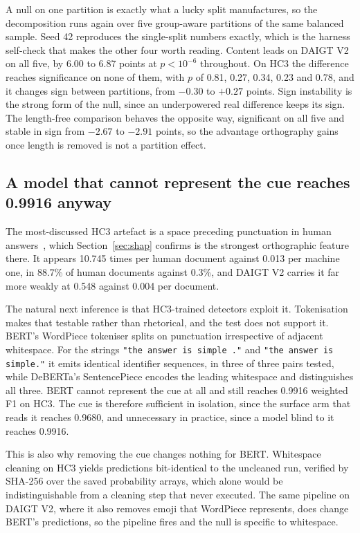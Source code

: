 A null on one partition is exactly what a lucky split manufactures, so the decomposition runs again over five group-aware partitions of the same balanced sample. Seed 42 reproduces the single-split numbers exactly, which is the harness self-check that makes the other four worth reading. Content leads on DAIGT V2 on all five, by 6.00 to 6.87 points at $p < 10^{-6}$ throughout. On HC3 the difference reaches significance on none of them, with $p$ of 0.81, 0.27, 0.34, 0.23 and 0.78, and it changes sign between partitions, from $-0.30$ to $+0.27$ points. Sign instability is the strong form of the null, since an underpowered real difference keeps its sign. The length-free comparison behaves the opposite way, significant on all five and stable in sign from $-2.67$ to $-2.91$ points, so the advantage orthography gains once length is removed is not a partition effect.

\subsection{A model that cannot represent the cue reaches 0.9916 anyway}
\label{sec:tokenisation}

The most-discussed HC3 artefact is a space preceding punctuation in human answers~\cite{Tian2023multiscale}, which Section~\ref{sec:shap} confirms is the strongest orthographic feature there. It appears 10.745 times per human document against 0.013 per machine one, in 88.7\% of human documents against 0.3\%, and DAIGT V2 carries it far more weakly at 0.548 against 0.004 per document.

The natural next inference is that HC3-trained detectors exploit it. Tokenisation makes that testable rather than rhetorical, and the test does not support it. BERT's WordPiece tokeniser splits on punctuation irrespective of adjacent whitespace. For the strings \texttt{"the answer is simple ."} and \texttt{"the answer is simple."} it emits identical identifier sequences, in three of three pairs tested, while DeBERTa's SentencePiece encodes the leading whitespace and distinguishes all three. BERT cannot represent the cue at all and still reaches 0.9916 weighted F1 on HC3. The cue is therefore sufficient in isolation, since the surface arm that reads it reaches 0.9680, and unnecessary in practice, since a model blind to it reaches 0.9916.

This is also why removing the cue changes nothing for BERT. Whitespace cleaning on HC3 yields predictions bit-identical to the uncleaned run, verified by SHA-256 over the saved probability arrays, which alone would be indistinguishable from a cleaning step that never executed. The same pipeline on DAIGT V2, where it also removes emoji that WordPiece represents, does change BERT's predictions, so the pipeline fires and the null is specific to whitespace.

